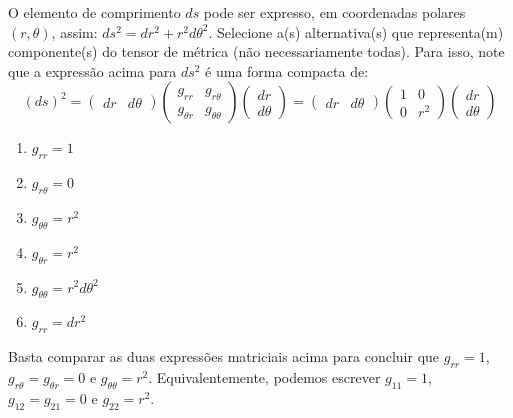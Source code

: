 \begin{question}
    O elemento de comprimento $ds$ pode ser expresso, em coordenadas polares $(r, \theta)$, assim: $ds^2 = dr^2 + r^2 d\theta^2$.
    Selecione a(s) alternativa(s) que representa(m) componente(s) do tensor de métrica (não necessariamente todas).
    Para isso, note que a expressão acima para $ds^2$ é uma forma compacta de:
    \begin{equation*}
      (ds)^2 = 
      \begin{pmatrix}
        dr & d\theta
      \end{pmatrix}
      \begin{pmatrix}
        g_{rr} & g_{r\theta } \\
        g_{\theta r} & g_{\theta \theta }
      \end{pmatrix}
      \begin{pmatrix}
        dr \\
        d\theta
      \end{pmatrix} =
      \begin{pmatrix}
        dr & d\theta
      \end{pmatrix}
      \begin{pmatrix}
        1 & 0 \\
        0 & r^2
      \end{pmatrix}
      \begin{pmatrix}
        dr \\
        d\theta
      \end{pmatrix}
    \end{equation*}

    \begin{enumerate}
      \item $g_{rr} = 1$ \rightanswer
      \item $g_{r \theta} = 0$ \rightanswer
      \item $g_{\theta\theta} = r^2$ \rightanswer
      \item $g_{\theta r} = r^2$
      \item $g_{\theta\theta} = r^2d\theta^2$
      \item $g_{rr} = dr^2$
    \end{enumerate}

    \begin{solution}
      Basta comparar as duas expressões matriciais acima para concluir que $g_{rr} = 1$, $g_{r \theta} = g_{\theta r} = 0$ e $g_{\theta\theta} = r^2$.
      Equivalentemente, podemos escrever $g_{11} = 1$, $g_{12} = g_{21} = 0$ e $g_{22} = r^2$.
    \end{solution}
\end{question}